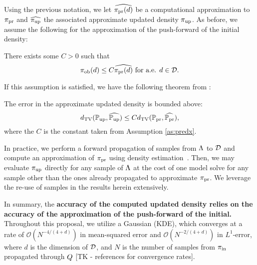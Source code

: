 

Using the previous notation, we let $\widehat{\operatorname*{\pi_{pr}}(d)}$ be a computational approximation to $\operatorname*{\pi_{pr}}$ and $\widehat{\operatorname*{\pi_{up}}}$ the associated approximate updated density $\operatorname*{\pi_{up}}$.
As before, we assume the following for the approximation of the push-forward of the initial density:
\begin{assumption}\label{as:predx}
There exists some $C>0$ such that
\[
\operatorname*{\pi_{ob}} (d) \leq C \widehat{\operatorname*{\pi_{pr}}(d)} \text{ for a.e. } d\in \mathcal{D}.
\]
\end{assumption}

If this assumption is satisfied, we have the following theorem from \cite{BJW18}:
\begin{thm}
  The error in the approximate updated density is bounded above:
  \begin{equation}\label{eq:predicted_bound}
    d_{\text{TV}} (\operatorname*{\mathbb{P}_{up}}, \widehat{\operatorname*{\mathbb{P}_{up}}}) \leq C d_{\text{TV}} (\operatorname*{\mathbb{P}_{pr}}, \widehat{\operatorname*{\mathbb{P}_{pr}}}),
  \end{equation}
  where the $C$ is the constant taken from Assumption \ref{as:predx}.
\end{thm}

In practice, we perform a forward propagation of samples from ${\Lambda}$ to $\mathcal{D}$ and compute an approximation of $\operatorname*{\pi_{pr}}$ using density estimation~\cite{BJW18}.
Then, we may evaluate $\operatorname*{\pi_{up}}$ directly for any sample of ${\Lambda}$ at the cost of one model solve for any sample other than the ones already propagated to approximate $\operatorname*{\pi_{pr}}$.
We leverage the re-use of samples in the results herein extensively.

In summary, the \textbf{accuracy of the computed updated density relies on the accuracy of the approximation of the push-forward of the initial.}
Throughout this proposal, we utilize a Gaussian (KDE), which converges at a rate of $\mathcal{O}(N^{-4/(4+d)})$ in mean-squared error and $\mathcal{O}(N^{-2/(4+d)})$ in $L^1$-error, where $d$ is the dimension of $\mathcal{D}$, and $N$ is the number of samples from $\operatorname*{\pi_{in}}$ propagated through $Q$ [TK - references for convergence rates].

